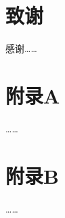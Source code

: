 \documentclass[unicode,bachelor]{seuthesis} %
\begin{document}
\chapter{致谢}
感谢……



\begin{appendix}
  \chapter{附录A}
  ……

  \chapter{附录B}
  ……
\end{appendix}

\newpage
\printindex %

\backcover %
\end{document}
